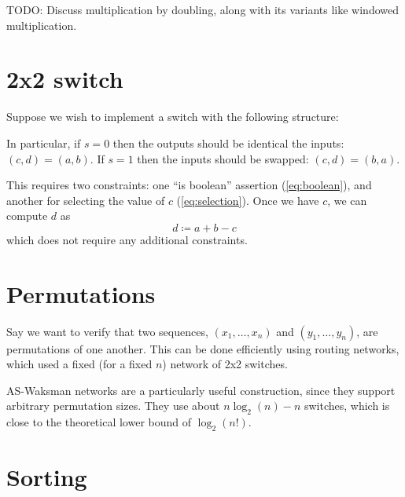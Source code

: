 \documentclass{article}
\begin{document}
TODO: Discuss multiplication by doubling, along with its variants like windowed multiplication.

%


\section{2x2 switch}

Suppose we wish to implement a switch with the following structure:
\begin{center}
\end{center}
In particular, if $s = 0$ then the outputs should be identical the inputs: $(c, d) = (a, b)$. If $s = 1$ then the inputs should be swapped: $(c, d) = (b, a)$.

This requires two constraints: one ``is boolean'' assertion (\autoref{eq:boolean}), and another for selecting the value of $c$ (\autoref{eq:selection}). Once we have $c$, we can compute $d$ as
\begin{equation}
  d \coloneqq a + b - c
\end{equation}
which does not require any additional constraints.


\section{Permutations} \label{sec:permutations}

Say we want to verify that two sequences, $(x_1, \dots, x_n)$ and $(y_1, \dots, y_n)$, are permutations of one another. This can be done efficiently using routing networks, which used a fixed (for a fixed $n$) network of 2x2 switches.

AS-Waksman networks \cite{beauquier2002arbitrary} are a particularly useful construction, since they support arbitrary permutation sizes. They use about $n \log_2(n) - n$ switches, which is close to the theoretical lower bound of $\log_2(n!)$.


\section{Sorting}
\end{document}
